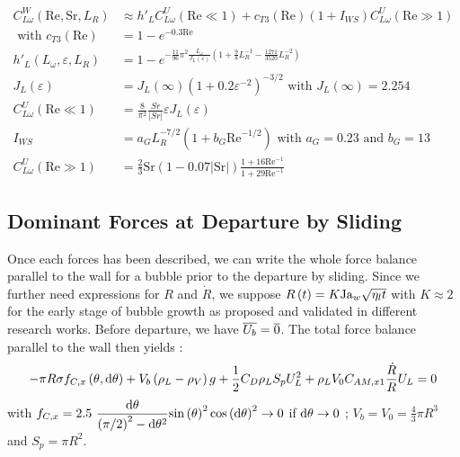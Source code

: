 \npar
\begin{align}
C_{L\omega}^{W}\left(\text{Re}, \text{Sr}, L_{R}\right) &\approx h'_{L}C_{L\omega}^{U}\left(\text{Re}\ll 1\right) + c_{T3}\left(\text{Re}\right)\left(1+I_{WS}\right)C_{L\omega}^{U}\left(\text{Re}\gg 1\right) \\
\text{ with } c_{T3}\left(\text{Re}\right) &= 1-e^{-0.3\text{Re}}\\
h'_{L}\left(L_{\omega}, \varepsilon, L_{R}\right)&=1-e^{ -\frac{11}{96}\pi^{2}\frac{L_{\omega}}{J_{L}(\varepsilon)}\left(1+\frac{9}{8}L_{R}^{-1}-\frac{1271}{3520}L_{R}^{-2}\right)} \\
J_{L}(\varepsilon)&=J_{L}\left(\infty\right)\left(1+0.2\varepsilon^{-2}\right)^{-3/2} \text{ with } J_{L}\left(\infty\right)=2.254 \\
C_{L \omega}^{U}\left(\text{Re}\ll 1\right) &= \frac{8}{\pi^{2}} \frac{Sr}{\left|Sr\right|}\varepsilon J_{L}(\varepsilon)\\
I_{WS}&=a_{G}L_{R}^{-7/2}\left(1+b_{G}\text{Re}^{-1/2}\right) \text{ with } a_{G}=0.23 \text { and } b_{G}=13\\
C_{L \omega}^{U}\left(\text{Re}\gg 1 \right)&=\frac{2}{3}\text{Sr}\left(1-0.07\left|\text{Sr}\right|\right)\frac{1+16\text{Re}^{-1}}{1+29\text{Re}^{-1}}
\end{align}





\subsection{Dominant Forces at Departure by Sliding}

Once each forces has been described, we can write the whole force balance parallel to the wall for a bubble prior to the departure by sliding. Since we further need expressions for $R$ and $\dot{R}$, we suppose $R\left( t \right)=K\mathrm{Ja}_{w}\sqrt{\eta_{l}t}$ with $K\approx 2$ for the early stage  of bubble growth as proposed and validated in different research works\cite{Plesset1954, Klausner1993}. Before departure, we have $\overline{U_{b}}=\overline{0}$. The total force balance parallel to the wall then yields :
\begin{align}
- \pi R\sigma f_{C,x}\left( \theta, \mathrm{d\theta} \right) + V_{b}\left( \rho_{L}-\rho_{V} \right)g + \frac{1}{2}C_{D}\rho_{L}S_{p}U_{L}^{2} + \rho_{L}V_{0}C_{AM,x1}\frac{\dot{R}}{R}U_{L} = 0
\end{align}
with $\displaystyle f_{C,x}=2.5\ \frac{\dtheta}{\parth{\pi/2}^{2}-\dtheta^{2}}\sin{\theta}^{2}\cos{\dtheta}^{2} \to 0 $ if $\mathrm{d}\theta \to 0$ ; $V_{b}=V_{0}=\frac{4}{3}\pi R^{3}$ and $S_{p}=\pi R^{2}$.


